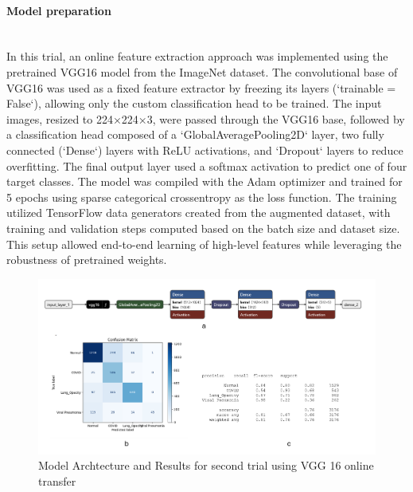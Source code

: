 \documentclass{article}
\begin{document}
\paragraph{Model preparation}\mbox{}\\
In this trial, an online feature extraction approach was implemented using the pretrained VGG16 model from the ImageNet dataset. The convolutional base of VGG16 was used as a fixed feature extractor by freezing its layers (`trainable = False`), allowing only the custom classification head to be trained. The input images, resized to 224×224×3, were passed through the VGG16 base, followed by a classification head composed of a `GlobalAveragePooling2D` layer, two fully connected (`Dense`) layers with ReLU activations, and `Dropout` layers to reduce overfitting. The final output layer used a softmax activation to predict one of four target classes. The model was compiled with the Adam optimizer and trained for 5 epochs using sparse categorical crossentropy as the loss function. The training utilized TensorFlow data generators created from the augmented dataset, with training and validation steps computed based on the batch size and dataset size. This setup allowed end-to-end learning of high-level features while leveraging the robustness of pretrained weights.
\begin{figure}[h!] %
    \centering
    \includegraphics[width=1.0\linewidth]{vgg16online1.png}
    \caption{Model Archtecture and Results for second trial using VGG 16 online transfer}
    \label{fig:vgg16result1.png}
\end{figure}
\end{document}
